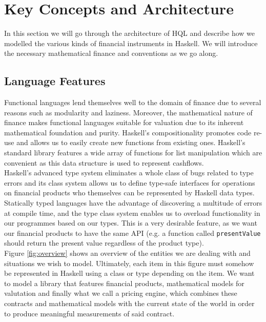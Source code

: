 \chapter{Key Concepts and Architecture}

In this section we will go through the architecture of HQL and describe how we
modelled the various kinds of financial instruments in Haskell. We will introduce
the necessary mathematical finance and conventions as we go along.

\section{Language Features}

Functional languages lend themselves well to the domain of finance due
to several reasons such as modularity\cite{hughes:matters-cj} and 
laziness\cite{composingcontracts}. Moreover, the mathematical nature
of finance makes functional languages suitable for valuation due to its
inherent mathematical foundation and purity. Haskell's compositionality
promotes code re-use and allows us to easily create new functions from
existing ones. Haskell's standard library features a wide array of
functions for list manipulation which are convenient as this data structure
is used to represent cashflows.\\

Haskell's advanced type system eliminates a whole class of bugs related to 
type errors and its 
class system allows us to define type-safe interfaces for operations on 
financial products who themselves can be represented by Haskell data types. 
Statically typed languages have the advantage of discovering a multitude of
errors at compile time, and the type class system enables us to overload 
functionality in our programmes based on our types. This is a very desirable
feature, as we want our financial products to have the same API (e.g. a function 
called \texttt{presentValue} should return the present value regardless of the
product type).\\

Figure \ref{fig:overview} shows an overview of the entities we are dealing with
and situations we wish to model. Ultimately, each item in this figure must somehow
be represented in Haskell using a class or type depending on the item. We
want to model a library that features financial products, mathematical models
for valutation and finally what we call a pricing engine, which combines 
these contracts and mathematical models with the current state of the world
in order to produce meaningful measurements of said contract.\\

